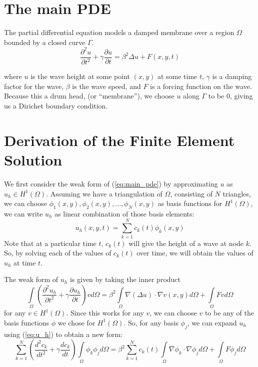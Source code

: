 \documentclass[a4paper,12pt]{article}
\begin{document}
\newcommand{\innerproduct}[2]{\int\limits_{\Omega} #1 #2 d\Omega}
\newcommand{\innerproductdot}[2]{\int\limits_{\Omega} \nabla #1 \cdot \nabla #2 d\Omega}
\newcommand{\firstderivative}[2]{\frac{d #1}{d #2}}
\newcommand{\secondderivative}[2]{\frac{d^2 #1}{d #2^2}}
\newcommand{\firstpartial}[2]{\frac{\partial #1}{\partial #2}}
\newcommand{\secondpartial}[2]{\frac{\partial^2 #1}{\partial #2^2}}
\newcommand{\laplacian}[1]{\Delta #1}

\section{The main PDE}
The partial differential equation models a damped membrane over a region $\Omega$ bounded by a closed curve $\Gamma$.
\begin{equation} \label{eq:main_pde}
\secondpartial{u}{t} + \gamma \firstpartial{u}{t}
=
\beta^2 \laplacian{u} + F(x,y,t)
\end{equation}

where $u$ is the wave height at some point $(x,y)$ at some time $t$, $\gamma$ is a damping factor for the wave,
$\beta$ is the wave speed, and $F$ is a forcing function on the wave. Because this a drum head, (or ``membrane''), we choose
$u$ along $\Gamma$ to be 0, giving us a Dirichet boundary condition.

\section{Derivation of the Finite Element Solution}
We first consider the weak form of (\ref{eq:main_pde}) by approximating $u$ as $u_h \in H^1(\Omega)$. Assuming we have
a triangulation of $\Omega$, consisting of $N$ triangles, we can choose 
$\phi_1(x,y), \phi_2(x,y), \ldots, \phi_N(x,y)$ as basis functions for $H^1(\Omega)$, we can write $u_h$ as linear
combination of those basis elements:
\begin{equation} \label{eq:u_h}
u_h(x,y,t) = \sum\limits_{k=1}^N c_k(t) \phi_k(x,y)
\end{equation}
Note that at a particular time $t$, $c_k(t)$ will give the height of a wave at node $k$. So, by solving each of the values
of $c_k(t)$ over time, we will obtain the values of $u_h$ at time $t$.

The weak form of $u_h$ is given by taking the inner product 
\begin{equation} \label{eq:u_h_weak_form}
\innerproduct{ \left( \secondpartial{u_h}{t} + \gamma \firstpartial{u_h}{t} \right) } { v }
=
\beta^2 \innerproductdot{ \left( \laplacian{u} \right) }{v(x,y)}
+ \innerproduct{F}{v}
\end{equation}
for any $v \in H^1(\Omega)$. Since this works for any $v$, we can choose $v$ to be any of the basis functions $\phi$
we chose for $H^1(\Omega)$. So, for any basis $\phi_j$, we can expand $u_h$ using (\ref{eq:u_h}) to obtain a new form:
\begin{equation} \label{eq:u_h_weak_form_expanded}
\sum\limits_{k=1}^N \left( \secondderivative{c_k}{t} + \gamma\firstderivative{c_k}{t} \right) \innerproduct{\phi_k}{\phi_j}
=
\beta^2\sum\limits_{k=1}^N c_k(t) \innerproductdot{\phi_k}{\phi_j}
+
\innerproduct{F}{\phi_j}
\end{equation}
\end{document}
